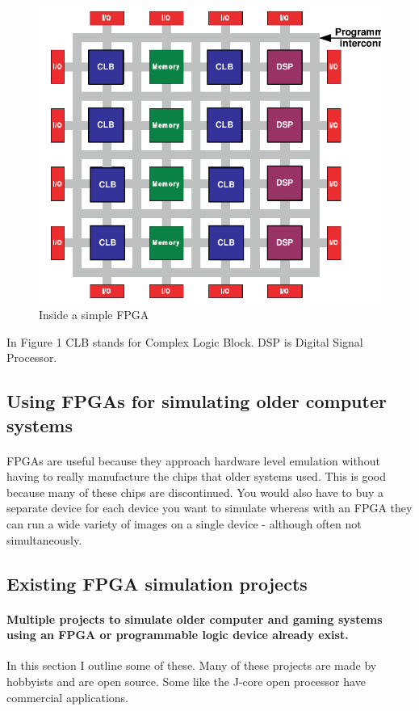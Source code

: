 \documentclass[twocolumn]{article}
\begin{document}
\begin{figure}[h]
\label{inside FPGA}
\includegraphics[scale=0.9]{FPGA insides 1.png}
\caption{Inside a simple FPGA}
\end{figure}

In Figure 1  CLB stands for Complex Logic Block. DSP is Digital Signal Processor.

\subsection{Using FPGAs for simulating older computer systems}
\paragraph{}FPGAs are useful because they approach hardware level emulation without having to really manufacture the chips that older systems used. This is good because many of these chips are discontinued. You would also have to buy a separate device for each device you want to simulate whereas with an FPGA they can run a wide variety of images on a single device - although often not simultaneously.

\subsection{Existing FPGA simulation  projects}
\paragraph{Multiple projects to simulate older computer and gaming systems using an FPGA or programmable logic device already exist.} In this section I outline some of these. Many of these projects are made by hobbyists and are open source. Some like the J-core open processor have commercial applications.
\end{document}
